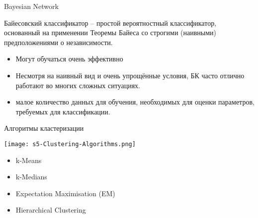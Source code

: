 \documentclass[pdf, intlimits, 9pt, unicode]{beamer}
\begin{document}
\begin{frame}{Bayesian Network}

Байесовский классификатор -- простой вероятностный классификатор, основанный на применении Теоремы Байеса со строгими (наивными) предположениями о независимости.\pause

\begin{itemize}
\item Могут обучаться очень эффективно \pause %
\item Несмотря на наивный вид и очень упрощённые условия, БК часто отлично работают во многих сложных ситуациях.\pause
\item малое количество данных для обучения, необходимых для оценки параметров, требуемых для классификации.
\end{itemize}

\end{frame}






\begin{frame}{Алгоритмы кластеризации}

\begin{center}\texttt{[image: s5-Clustering-Algorithms.png]}\end{center}

\begin{itemize}
\item k-Means
\item k-Medians
\item Expectation Maximisation (EM)
\item Hierarchical Clustering
\end{itemize}

\end{frame}
\end{document}
